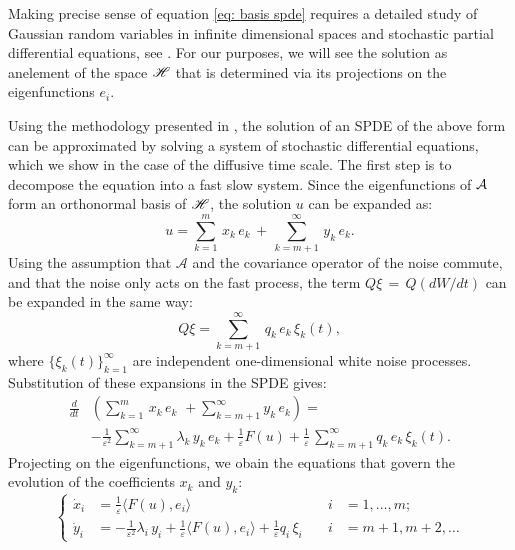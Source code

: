Making precise sense of equation \eqref{eq: basis spde} requires a detailed study
of Gaussian random variables in infinite dimensional spaces and stochastic
partial differential equations, see
\citep{da2008stochastic,hairer2009introduction}. For our purposes, we will see the
solution as anelement of the space $\mathscr H$ that is determined via its projections on the
eigenfunctions $e_i$. 

Using the methodology presented in \cite{abdulle2012numerical}, the solution of an SPDE
of the above form can be approximated by solving a system of stochastic
differential equations, which we show in the case of the diffusive time scale.
The first step is to decompose the equation into a fast slow system. Since the
eigenfunctions of $\mathcal A$ form an orthonormal basis of $\mathscr H$, the solution
$u$ can be expanded as: 
\begin{equation*} 
    u = \sum_{k=1}^{m} \,x_{k}\,e_{k} \,+\,\sum_{k=m+1}^{\infty} \,y_{k}\,e_{k}.  
\end{equation*}
Using the assumption that $\mathcal A$ and the covariance
operator of the noise commute, and that the noise only acts on the fast
process, the term $Q{\xi}\,=\,Q (dW/dt)$ can be expanded in the same way: 
\begin{equation*} 
    Q{\xi}= \sum_{k=m+1}^{\infty}\,q_{k}\,e_{k}\,{\xi}_{k}(t),
\end{equation*} 
where $\{\xi_{k}(t) \}_{k=1}^{\infty}$ are independent one-dimensional white
noise processes. Substitution of these expansions in the SPDE gives: 
\begin{equation*}
    \begin{aligned} 
        \frac d{dt} & \left(\sum_{k=1}^{m}\,x_{k}\,e_{k}\,\,+\sum_{k=m+1}^{\infty}
            y_{k}\,e_{k} \right) = \\ & -\frac 1{\varepsilon^{2}}\sum_{k=m+1}^{\infty}
        \lambda_{k}\,y_{k}\,e_{k} + \frac 1 \varepsilon F(u) + \frac 1 \varepsilon\,
        \sum_{k=m+1}^{\infty}q_{k}\,e_{k}\,\xi_{k}(t).  
    \end{aligned} 
\end{equation*}
Projecting on the eigenfunctions, we obain the equations that govern
the evolution of the coefficients $x_k$ and $y_k$:
\begin{equation*} 
    \left\{\begin{aligned}
            \dot x_{i} &= \frac 1 \varepsilon\langle F(u), e_{i}\rangle & \quad i & = 1,\dots,
            m;\\ \dot y_{i} &= -\frac 1 {\varepsilon^{2}} {\lambda}_{i}\,y_{i} + \frac 1\varepsilon\langle
            F(u), e_{i}\rangle +\frac 1\varepsilon q_{i}\,\xi_{i} & \quad i &= m+1,m+2, \dots
        \end{aligned} \right.  
\end{equation*} 
